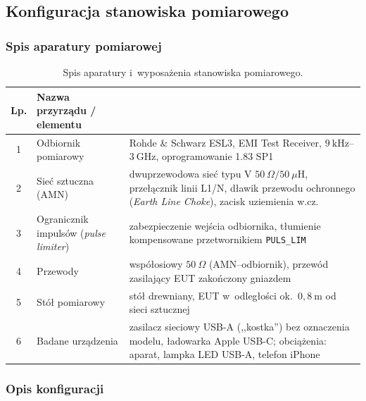 \documentclass[11pt,a4paper]{article}
\begin{document}
\subsection{Konfiguracja stanowiska pomiarowego}

\subsubsection{Spis aparatury pomiarowej}

\begin{table}[H]
  \centering
  \small
  \caption{Spis aparatury i~wyposażenia stanowiska pomiarowego.}
  \label{tab:aparatura}
  \renewcommand{\arraystretch}{1.25}
  \begin{tabular}{|c|>{\raggedright\arraybackslash}p{4.6cm}|>{\raggedright\arraybackslash}p{8.2cm}|}
    \hline
    \textbf{Lp.} & \textbf{Nazwa przyrządu / elementu} & \multicolumn{1}{c|}{\textbf{Model lub typ, uwagi}} \\
    \hline
    1 & Odbiornik pomiarowy & Rohde \& Schwarz ESL3, EMI Test Receiver, $9\ \mathrm{kHz}$--$3\ \mathrm{GHz}$,
        oprogramowanie 1.83 SP1 \\
    \hline
    2 & Sieć sztuczna (AMN) & dwuprzewodowa sieć typu V $50\ \Omega/50\ \mu\mathrm{H}$, przełącznik
        linii L1/N, dławik przewodu ochronnego (\emph{Earth Line Choke}), zacisk uziemienia
        w.cz. \\
    \hline
    3 & Ogranicznik impulsów (\emph{pulse limiter}) & zabezpieczenie wejścia odbiornika,
        tłumienie kompensowane przetwornikiem \texttt{PULS\_LIM} \\
    \hline
    4 & Przewody & współosiowy $50\ \Omega$ (AMN--odbiornik), przewód zasilający EUT zakończony gniazdem \\
    \hline
    5 & Stół pomiarowy & stół drewniany, EUT w~odległości ok.~$0{,}8\ \mathrm{m}$ od sieci sztucznej \\
    \hline
    6 & Badane urządzenia & zasilacz sieciowy USB-A (,,kostka'') bez oznaczenia modelu, ładowarka Apple USB-C;
        obciążenia: aparat, lampka LED USB-A, telefon iPhone \\
    \hline
  \end{tabular}
\end{table}

\subsubsection{Opis konfiguracji}
\end{document}
